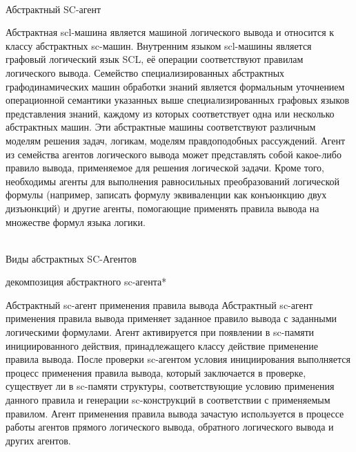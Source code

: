 \begin{frame}{\\Абстрактный SC-агент}
\vspace{12mm}
\begin{scn}
Абстрактная scl-машина является машиной логического вывода и относится к классу абстрактных sc-машин. Внутренним языком scl-машины является графовый логический язык SCL, её операции соответствуют правилам логического вывода. Семейство специализированных абстрактных графодинамических машин обработки знаний является формальным уточнением операционной семантики указанных выше специализированных графовых языков представления знаний, каждому из которых соответствует одна или несколько абстрактных машин. Эти абстрактные машины соответствуют различным моделям решения задач, логикам, моделям правдоподобных рассуждений. Агент из семейства агентов логического вывода может представлять собой какое-либо правило вывода, применяемое для решения логической задачи. Кроме того, необходимы агенты для выполнения равносильных преобразований логической формулы (например, записать формулу эквиваленции как конъюнкцию двух дизъюнкций) и другие агенты, помогающие применять правила вывода на множестве формул языка логики.
\end{scn}
\end{frame}

\begin{frame}{\\Виды абстрактных SC-Агентов}
    \begin{scn}
		\begin{scnrelfromset}{декомпозиция абстрактного sc-агента*}
		\end{scnrelfromset}	
    \end{scn}
\end{frame}

\begin{frame}{\Large Абстрактный sc-агент применения правила вывода}
\vspace{8mm}
  Абстрактный sc-агент применения правила вывода применяет заданное правило вывода с заданными логическими формулами. Агент активируется при появлении в sc-памяти инициированного действия, принадлежащего классу действие применение правила вывода. После проверки sc-агентом условия инициирования выполняется процесс применения правила вывода, который заключается в проверке, существует ли в sc-памяти структуры, соответствующие условию применения данного правила и генерации sc-конструкций в соответствии с применяемым правилом. Агент применения правила вывода зачастую используется в процессе работы агентов прямого логического вывода, обратного логического вывода и других агентов.  
\end{frame}

